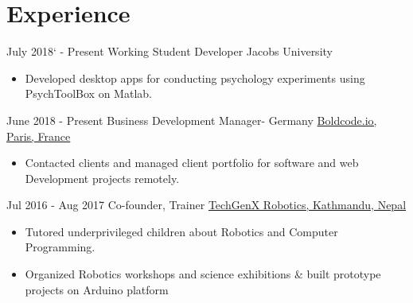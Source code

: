 \documentclass[letterpaper]{twentysecondcv} %
\begin{document}

\section{Experience}

\begin{twenty} %

 \twentyitem
    	{July 2018` -}
		{Present}
        {Working Student Developer}
        {Jacobs University}
        {}
        {\begin{itemize}
        \item Developed  desktop apps for conducting psychology experiments using PsychToolBox on Matlab.
        \end{itemize}}
        
    \twentyitem
   		{June 2018 -}
		{Present}
        {Business Development Manager- Germany}
        {\href{http://www.boldcode.io}{Boldcode.io, Paris, France}}
        {}
        {
        {\begin{itemize}
        \item Contacted clients and managed client portfolio for software and web Development projects remotely.
    \end{itemize}}
        }
        
        \twentyitem
   		{Jul 2016 -}
		{Aug 2017}
        {Co-founder, Trainer}
        {\href{https://techgenxblog.wordpress.com}{TechGenX Robotics, Kathmandu, Nepal}}
        {}
        {
        {\begin{itemize}
        \item Tutored underprivileged children about Robotics and Computer Programming.
        \item Organized Robotics workshops and science exhibitions \& built prototype projects on Arduino platform
    \end{itemize}}
        }
        
   

\end{twenty}
\end{document}
